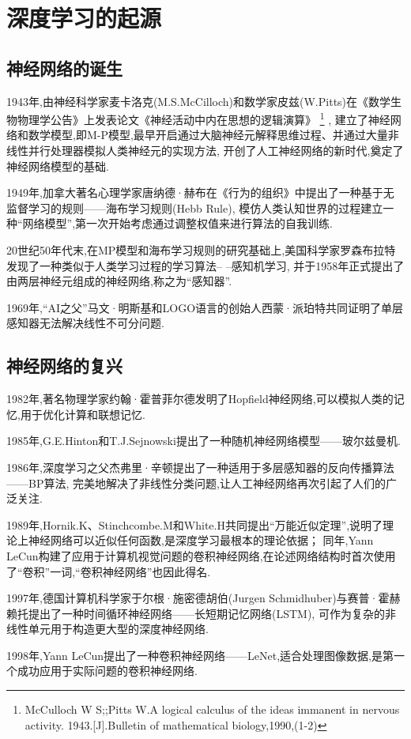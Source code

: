 \documentclass[UTF8]{ctexbook}
\begin{document}
\section{深度学习的起源}
\subsection{神经网络的诞生}
1943年,由神经科学家麦卡洛克(M.S.McCilloch)和数学家皮兹(W.Pitts)在《数学生物物理学公告》上发表论文《神经活动中内在思想的逻辑演算》
\footnote{McCulloch W S;;Pitts W.A logical calculus of the ideas immanent in nervous activity. 1943.[J].Bulletin of mathematical biology,1990,(1-2)} ,
建立了神经网络和数学模型,即M-P模型,最早开启通过大脑神经元解释思维过程、并通过大量非线性并行处理器模拟人类神经元的实现方法,
开创了人工神经网络的新时代,奠定了神经网络模型的基础.

1949年,加拿大著名心理学家唐纳德·赫布在《行为的组织》中提出了一种基于无监督学习的规则——海布学习规则(Hebb Rule),
模仿人类认知世界的过程建立一种“网络模型”,第一次开始考虑通过调整权值来进行算法的自我训练.

20世纪50年代末,在MP模型和海布学习规则的研究基础上,美国科学家罗森布拉特发现了一种类似于人类学习过程的学习算法-- --感知机学习,
并于1958年正式提出了由两层神经元组成的神经网络,称之为“感知器”.

1969年,“AI之父”马文·明斯基和LOGO语言的创始人西蒙·派珀特共同证明了单层感知器无法解决线性不可分问题.
\subsection{神经网络的复兴}
1982年,著名物理学家约翰·霍普菲尔德发明了Hopfield神经网络,可以模拟人类的记忆,用于优化计算和联想记忆.

1985年,G.E.Hinton和T.J.Sejnowski提出了一种随机神经网络模型——玻尔兹曼机.

1986年,深度学习之父杰弗里·辛顿提出了一种适用于多层感知器的反向传播算法——BP算法,
完美地解决了非线性分类问题,让人工神经网络再次引起了人们的广泛关注.

1989年,Hornik.K、Stinchcombe.M和White.H共同提出“万能近似定理”,说明了理论上神经网络可以近似任何函数,是深度学习最根本的理论依据；
同年,Yann LeCun构建了应用于计算机视觉问题的卷积神经网络,在论述网络结构时首次使用了“卷积”一词,“卷积神经网络”也因此得名.

1997年,德国计算机科学家于尔根·施密德胡伯(Jurgen Schmidhuber)与赛普·霍赫赖托提出了一种时间循环神经网络——长短期记忆网络(LSTM),
可作为复杂的非线性单元用于构造更大型的深度神经网络.

1998年,Yann LeCun提出了一种卷积神经网络——LeNet,适合处理图像数据,是第一个成功应用于实际问题的卷积神经网络.
\end{document}
